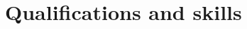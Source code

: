 \documentclass[11pt, a4paper, sans, blue]{moderncv}
\begin{document}








\section{Qualifications and skills}
\end{document}
